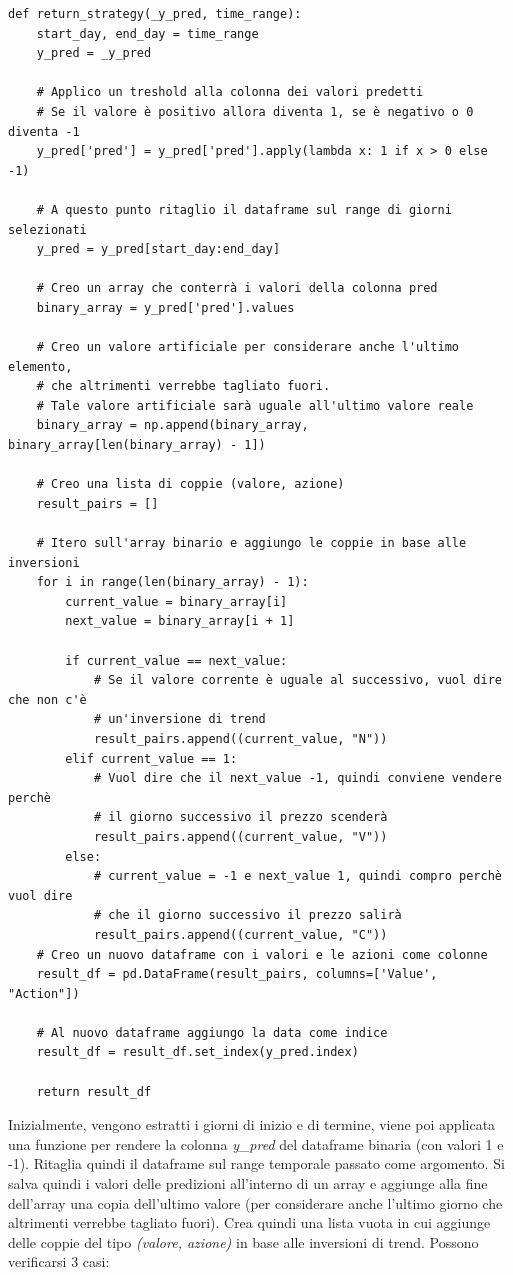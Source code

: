\documentclass{article}
\begin{document}
\begin{verbatim}
def return_strategy(_y_pred, time_range):
    start_day, end_day = time_range
    y_pred = _y_pred

    # Applico un treshold alla colonna dei valori predetti
    # Se il valore è positivo allora diventa 1, se è negativo o 0 diventa -1
    y_pred['pred'] = y_pred['pred'].apply(lambda x: 1 if x > 0 else -1)

    # A questo punto ritaglio il dataframe sul range di giorni selezionati
    y_pred = y_pred[start_day:end_day]

    # Creo un array che conterrà i valori della colonna pred
    binary_array = y_pred['pred'].values

    # Creo un valore artificiale per considerare anche l'ultimo elemento,
    # che altrimenti verrebbe tagliato fuori.
    # Tale valore artificiale sarà uguale all'ultimo valore reale
    binary_array = np.append(binary_array, binary_array[len(binary_array) - 1])

    # Creo una lista di coppie (valore, azione)
    result_pairs = []

    # Itero sull'array binario e aggiungo le coppie in base alle inversioni
    for i in range(len(binary_array) - 1):
        current_value = binary_array[i]
        next_value = binary_array[i + 1]

        if current_value == next_value:
            # Se il valore corrente è uguale al successivo, vuol dire che non c'è
            # un'inversione di trend
            result_pairs.append((current_value, "N"))
        elif current_value == 1:
            # Vuol dire che il next_value -1, quindi conviene vendere perchè
            # il giorno successivo il prezzo scenderà
            result_pairs.append((current_value, "V"))
        else:
            # current_value = -1 e next_value 1, quindi compro perchè vuol dire
            # che il giorno successivo il prezzo salirà
            result_pairs.append((current_value, "C"))
    # Creo un nuovo dataframe con i valori e le azioni come colonne
    result_df = pd.DataFrame(result_pairs, columns=['Value', "Action"])

    # Al nuovo dataframe aggiungo la data come indice
    result_df = result_df.set_index(y_pred.index)

    return result_df
\end{verbatim}
Inizialmente, vengono estratti i giorni di inizio e di termine, viene poi applicata una funzione per rendere la colonna \textit{y\_pred} del dataframe binaria (con valori 1 e -1). Ritaglia quindi il dataframe sul range temporale passato come argomento. Si salva quindi i valori delle predizioni all'interno di un array e aggiunge alla fine dell'array una copia dell'ultimo valore (per considerare anche l'ultimo giorno che altrimenti verrebbe tagliato fuori). Crea quindi una lista vuota in cui aggiunge delle coppie del tipo \textit{(valore, azione)} in base alle inversioni di trend. Possono verificarsi 3 casi:
\end{document}
